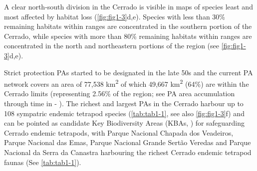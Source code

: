 \documentclass[12pt,openright,oneside,a4paper,english]{abntex2}
\begin{document}
A clear north-south division in the Cerrado is visible in maps of species least and most affected by habitat loss (\autoref{fig:fig1-3}d,e). Species with less than 30\% remaining habitats within ranges are concentrated in the southern portion of the Cerrado, while species with more than 80\% remaining habitats within ranges are concentrated in the north and northeastern portions of the region (see \autoref{fig:fig1-3}d,e).



Strict protection PAs started to be designated in the late 50s and the current PA network covers an area of 77,538 km\textsuperscript{2} of which 49,667 km\textsuperscript{2} (64\%) are within the Cerrado limits (representing 2.56\% of the region; see PA area accumulation through time in  - ). The richest and largest PAs in the Cerrado harbour up to 108 sympatric endemic tetrapod species (\autoref{tab:tab1-1}, see also \autoref{fig:fig1-3}f) and can be pointed as candidate Key Biodiversity Areas (KBAs, \citealp[see][]{KBAs2022}) for safeguarding Cerrado endemic tetrapods, with Parque Nacional Chapada dos Veadeiros, Parque Nacional das Emas, Parque Nacional Grande Sertão Veredas and Parque Nacional da Serra da Canastra harbouring the richest Cerrado endemic tetrapod faunas (See \autoref{tab:tab1-1}). 
\end{document}
